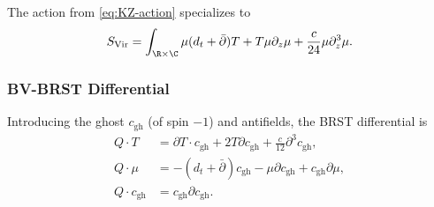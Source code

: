 The action from \eqref{eq:KZ-action} specializes to
\begin{equation}
\label{eq:virasoro-action}
S_{\text{Vir}} = \int_{\R \times \C} \mu (d_t + \bar{\partial})T + T \mu \partial_z \mu + \frac{c}{24} \mu \partial_z^3 \mu.
\end{equation}

\subsubsection{BV-BRST Differential}

Introducing the ghost $c_{\mathrm{gh}}$ (of spin $-1$) and antifields, the BRST differential is
\begin{align}
Q \cdot T &= \partial T \cdot c_{\mathrm{gh}} + 2T \partial c_{\mathrm{gh}} + \frac{c}{12} \partial^3 c_{\mathrm{gh}},\\
Q \cdot \mu &= -(d_t + \bar{\partial})c_{\mathrm{gh}} - \mu \partial c_{\mathrm{gh}} + c_{\mathrm{gh}} \partial \mu,\\
Q \cdot c_{\mathrm{gh}} &= c_{\mathrm{gh}} \partial c_{\mathrm{gh}}.
\end{align}

